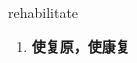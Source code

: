 
\begin{frame}
{\huge rehabilitate}
\begin{center}
\begin{enumerate}\Large
  \item \textbf{使复原，使康复}
\end{enumerate}
\end{center}
\end{frame}
